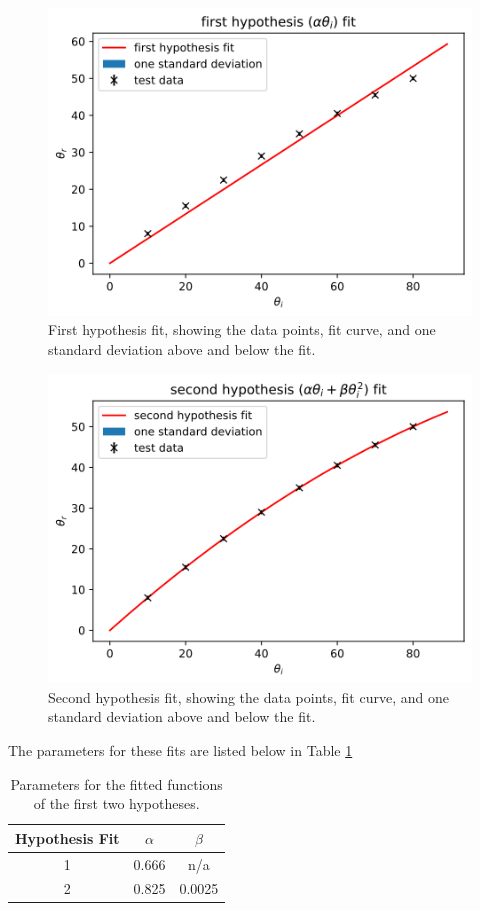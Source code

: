 \documentclass[a4paper]{article}
\begin{document}
\begin{figure}[h!]
\centerline{\includegraphics[scale=0.7]{fit1.png}}
\caption{First hypothesis fit, showing the data points, fit curve, and one standard deviation above and below the fit.}
\label{fig:fit1}
\end{figure}

\begin{figure}[h!]
\centerline{\includegraphics[scale=0.7]{fit2.png}}
\caption{Second hypothesis fit, showing the data points, fit curve, and one standard deviation above and below the fit.}
\label{fig:fit2}
\end{figure}

The parameters for these fits are listed below in Table \ref{tab:params1}

\begin{table}[h!]
\centering
\begin{tabular}{ccc}
\hline
Hypothesis Fit & $\alpha$ & $\beta$\\ \hline
1 & 0.666 & n/a \\
2 & 0.825 & 0.0025 \\
\end{tabular}
\caption{\label{tab:params1}Parameters for the fitted functions of the first two hypotheses.}
\end{table}
\end{document}
